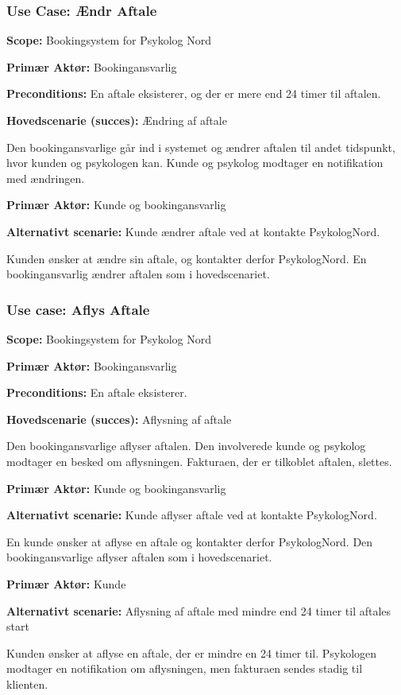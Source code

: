\subsubsection{Use Case: Ændr Aftale}
{\setlength{\parindent}{0cm}
\textbf{Scope:} Bookingsystem for Psykolog Nord

\textbf{Primær Aktør:} Bookingansvarlig 

\textbf{Preconditions:} En aftale eksisterer, og der er mere end 24 timer til aftalen.

\textbf{Hovedscenarie (succes):} Ændring af aftale

Den bookingansvarlige går ind i systemet og ændrer aftalen til andet tidspunkt, hvor kunden og psykologen kan.
Kunde og psykolog modtager en notifikation med ændringen.

\textbf{Primær Aktør:} Kunde og bookingansvarlig

\textbf{Alternativt scenarie:} Kunde ændrer aftale ved at kontakte PsykologNord.

Kunden ønsker at ændre sin aftale, og kontakter derfor PsykologNord.
En bookingansvarlig ændrer aftalen som i hovedscenariet.
}

\subsubsection{Use case: Aflys Aftale}
{\setlength{\parindent}{0cm}
\textbf{Scope:} Bookingsystem for Psykolog Nord

\textbf{Primær Aktør:} Bookingansvarlig

\textbf{Preconditions:} En aftale eksisterer.

\textbf{Hovedscenarie (succes):} Aflysning af aftale

Den bookingansvarlige aflyser aftalen.
Den involverede kunde og psykolog modtager en besked om aflysningen. Fakturaen, der er tilkoblet aftalen, slettes.

\textbf{Primær Aktør:} Kunde og bookingansvarlig

\textbf{Alternativt scenarie:} Kunde aflyser aftale ved at kontakte PsykologNord.

En kunde ønsker at aflyse en aftale og kontakter derfor PsykologNord.
Den bookingansvarlige aflyser aftalen som i hovedscenariet.

\textbf{Primær Aktør:} Kunde

\textbf{Alternativt scenarie:} Aflysning af aftale med mindre end 24 timer til aftales start

Kunden ønsker at aflyse en aftale, der er mindre en 24 timer til.
Psykologen modtager en notifikation om aflysningen, men fakturaen sendes stadig til klienten.
}

